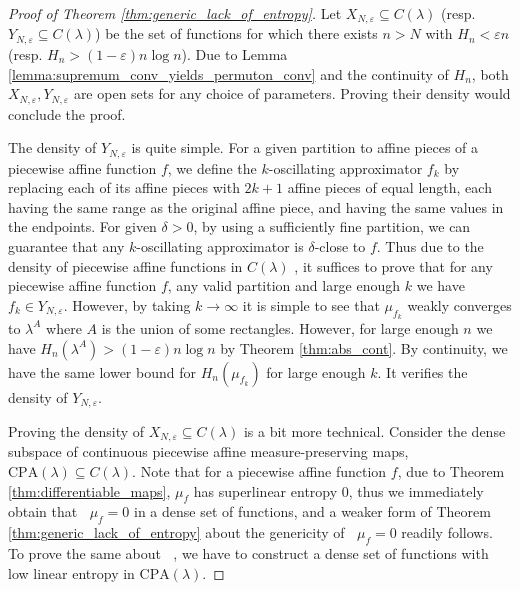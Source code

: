 \documentclass[11pt]{article}
\newcommand{\lowersupent}{\mathop{\underline{H}^{\mathrm{superlin}}}}
\newcommand{\lowerlinent}{\mathop{\underline{H}^{\mathrm{lin}}}}
\theoremstyle{definition}
\begin{document}
\begin{proof}[Proof of Theorem \ref{thm:generic_lack_of_entropy}] 

Let $X_{N,\varepsilon}\subseteq C(\lambda)$ (resp. $Y_{N, \varepsilon}\subseteq C(\lambda)$) be the set of functions for which there exists $n>N$ with $H_n< \varepsilon n $ (resp. $H_n>(1-\varepsilon) n\log n$). Due to Lemma \ref{lemma:supremum_conv_yields_permuton_conv} and the continuity of $H_n$, both $X_{N,\varepsilon}, Y_{N, \varepsilon}$ are open sets for any choice of parameters. Proving their density would conclude the proof.

The density of $Y_{N, \varepsilon}$ is quite simple. For a given partition to affine pieces of a piecewise affine function $f$, we define the $k$-oscillating approximator $f_k$ by replacing each of its affine pieces with $2k+1$ affine pieces of equal length, each having the same range as the original affine piece, and having the same values in the endpoints. For given $\delta>0$, by using a sufficiently fine partition, we can guarantee that any $k$-oscillating approximator is $\delta$-close to $f$. Thus due to the density of piecewise affine functions in $C(\lambda)$ \cite[Proposition~8]{Bobok_2020}, it suffices to prove that for any piecewise affine function $f$, any valid partition and large enough $k$ we have $f_k\in Y_{N, \varepsilon}$. However, by taking $k\to\infty$ it is simple to see that $\mu_{f_k}$ weakly converges to $\lambda^A$ where $A$ is the union of some rectangles. However, for large enough $n$ we have $H_n(\lambda^A)>(1-\varepsilon)n\log n$ by Theorem \ref{thm:abs_cont}. By continuity, we have the same lower bound for $H_n(\mu_{f_k})$ for large enough $k$. It verifies the density of $Y_{N, \varepsilon}$.

Proving the density of $X_{N,\varepsilon}\subseteq C(\lambda)$ is a bit more technical. Consider the dense subspace of continuous piecewise affine measure-preserving maps, $\mathrm{CPA}(\lambda)\subseteq C(\lambda)$. Note that for a piecewise affine function $f$, due to Theorem \ref{thm:differentiable_maps}, $\mu_f$ has superlinear entropy 0, thus we immediately obtain that $\lowersupent \mu_f = 0$ in a dense set of functions, and a weaker form of Theorem \ref{thm:generic_lack_of_entropy} about the genericity of $\lowersupent \mu_f = 0$ readily follows. To prove the same about $\lowerlinent$, we have to construct a dense set of functions with low linear entropy in $\mathrm{CPA}(\lambda)$.


\end{proof}
\end{document}
